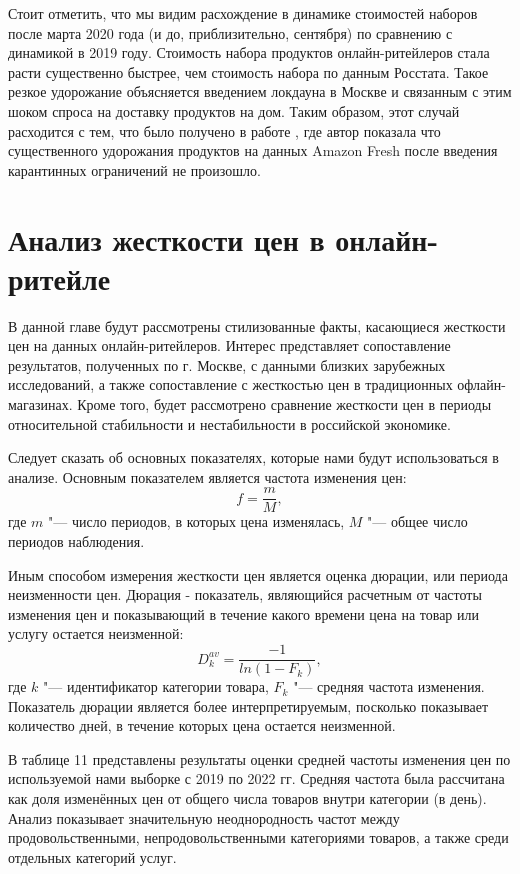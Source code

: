 Стоит отметить, что мы видим расхождение в динамике стоимостей наборов после марта 2020 года (и до, приблизительно, сентября) по сравнению с динамикой в 2019 году. Стоимость набора продуктов онлайн-ритейлеров стала расти существенно быстрее, чем стоимость набора по данным Росстата. Такое резкое удорожание объясняется введением локдауна в Москве и связанным с этим шоком спроса на доставку продуктов на дом. Таким образом, этот случай расходится с тем, что было получено в работе \cite{hillen2021covid}, где автор показала что существенного удорожания продуктов на данных Amazon Fresh после введения карантинных ограничений не произошло. 

\section{Анализ жесткости цен в онлайн-ритейле}\label{sec:ch3/sec2}

В данной главе будут рассмотрены стилизованные факты, касающиеся жесткости цен на данных онлайн-ритейлеров. Интерес представляет сопоставление результатов, полученных по г. Москве, с данными близких зарубежных исследований, а также сопоставление с жесткостью цен в традиционных офлайн-магазинах. Кроме того, будет рассмотрено сравнение жесткости цен в периоды относительной стабильности и нестабильности в российской экономике.

Следует сказать об основных показателях, которые нами будут использоваться в анализе. Основным показателем является частота изменения цен:
\begin{equation}
	\label{eq:equation_freq}
	f=\frac{m}{M},
\end{equation}
где \( m \) "--- число периодов, в которых цена изменялась, \( M \) "--- общее число периодов наблюдения.

Иным способом измерения жесткости цен является оценка дюрации, или периода неизменности цен. Дюрация - показатель, являющийся расчетным от частоты изменения цен и показывающий в течение какого времени цена на товар или услугу остается неизменной:
\begin{equation}
	\label{eq:equation_duration}
	D_k^{av}=\frac{-1}{ln⁡(1-F_k)},
\end{equation}
где \( k \) "--- идентификатор категории товара, \( F_k \) "--- средняя частота изменения. Показатель дюрации является более интерпретируемым, посколько показывает количество дней, в течение которых цена остается неизменной.

В таблице 11 представлены результаты оценки средней частоты изменения цен по используемой нами выборке с 2019 по 2022 гг. Средняя частота была рассчитана как доля изменённых цен от общего числа товаров внутри категории (в день). Анализ показывает значительную неоднородность частот между продовольственными, непродовольственными категориями товаров, а также среди отдельных категорий услуг. 

